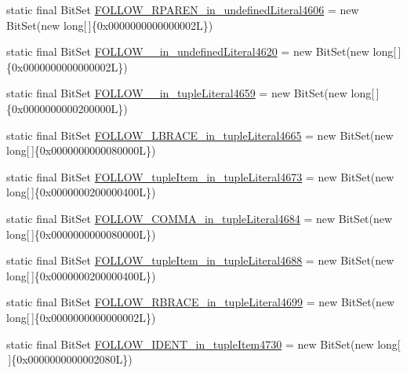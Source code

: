 \begin{DoxyCompactItemize}
\item 
static final Bit\-Set \hyperlink{classorg_1_1tzi_1_1use_1_1parser_1_1soil_1_1_soil_parser_a5d92ccc8660597d8828574d933679f14}{F\-O\-L\-L\-O\-W\-\_\-\-R\-P\-A\-R\-E\-N\-\_\-in\-\_\-undefined\-Literal4606} = new Bit\-Set(new long\mbox{[}$\,$\mbox{]}\{0x0000000000000002\-L\})
\item 
static final Bit\-Set \hyperlink{classorg_1_1tzi_1_1use_1_1parser_1_1soil_1_1_soil_parser_a6d97572300c6ad331d0139d606ad9cf2}{F\-O\-L\-L\-O\-W\-\_\-\_\-in\-\_\-undefined\-Literal4620} = new Bit\-Set(new long\mbox{[}$\,$\mbox{]}\{0x0000000000000002\-L\})
\item 
static final Bit\-Set \hyperlink{classorg_1_1tzi_1_1use_1_1parser_1_1soil_1_1_soil_parser_ab39e2eb1e30d6c549059eb271b336a78}{F\-O\-L\-L\-O\-W\-\_\-\_\-in\-\_\-tuple\-Literal4659} = new Bit\-Set(new long\mbox{[}$\,$\mbox{]}\{0x0000000000200000\-L\})
\item 
static final Bit\-Set \hyperlink{classorg_1_1tzi_1_1use_1_1parser_1_1soil_1_1_soil_parser_a3e6365b662c43e6c5b3e46a4b6602c86}{F\-O\-L\-L\-O\-W\-\_\-\-L\-B\-R\-A\-C\-E\-\_\-in\-\_\-tuple\-Literal4665} = new Bit\-Set(new long\mbox{[}$\,$\mbox{]}\{0x0000000000080000\-L\})
\item 
static final Bit\-Set \hyperlink{classorg_1_1tzi_1_1use_1_1parser_1_1soil_1_1_soil_parser_a2ff4f9f3e8a415c50a5fcf877bd38b5d}{F\-O\-L\-L\-O\-W\-\_\-tuple\-Item\-\_\-in\-\_\-tuple\-Literal4673} = new Bit\-Set(new long\mbox{[}$\,$\mbox{]}\{0x0000000200000400\-L\})
\item 
static final Bit\-Set \hyperlink{classorg_1_1tzi_1_1use_1_1parser_1_1soil_1_1_soil_parser_a01bead2b1a7aa9f3a7c0907abd45b435}{F\-O\-L\-L\-O\-W\-\_\-\-C\-O\-M\-M\-A\-\_\-in\-\_\-tuple\-Literal4684} = new Bit\-Set(new long\mbox{[}$\,$\mbox{]}\{0x0000000000080000\-L\})
\item 
static final Bit\-Set \hyperlink{classorg_1_1tzi_1_1use_1_1parser_1_1soil_1_1_soil_parser_a23c54dba1d1d00259666fcd2b37dea69}{F\-O\-L\-L\-O\-W\-\_\-tuple\-Item\-\_\-in\-\_\-tuple\-Literal4688} = new Bit\-Set(new long\mbox{[}$\,$\mbox{]}\{0x0000000200000400\-L\})
\item 
static final Bit\-Set \hyperlink{classorg_1_1tzi_1_1use_1_1parser_1_1soil_1_1_soil_parser_af3562fe0d2219323f5795e46f4db5fa4}{F\-O\-L\-L\-O\-W\-\_\-\-R\-B\-R\-A\-C\-E\-\_\-in\-\_\-tuple\-Literal4699} = new Bit\-Set(new long\mbox{[}$\,$\mbox{]}\{0x0000000000000002\-L\})
\item 
static final Bit\-Set \hyperlink{classorg_1_1tzi_1_1use_1_1parser_1_1soil_1_1_soil_parser_a2e4deb8c1c0ce02fffe3581226dad84d}{F\-O\-L\-L\-O\-W\-\_\-\-I\-D\-E\-N\-T\-\_\-in\-\_\-tuple\-Item4730} = new Bit\-Set(new long\mbox{[}$\,$\mbox{]}\{0x0000000000002080\-L\})

\end{DoxyCompactItemize}
